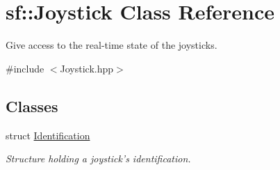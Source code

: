 \hypertarget{classsf_1_1_joystick}{\section{sf\-:\-:Joystick Class Reference}
\label{classsf_1_1_joystick}
}


Give access to the real-\/time state of the joysticks.  




{\ttfamily \#include $<$Joystick.\-hpp$>$}

\subsection*{Classes}
\begin{DoxyCompactItemize}
\item 
struct \hyperlink{structsf_1_1_joystick_1_1_identification}{Identification}
\begin{DoxyCompactList}\small\item\em Structure holding a joystick's identification. \end{DoxyCompactList}\end{DoxyCompactItemize}
